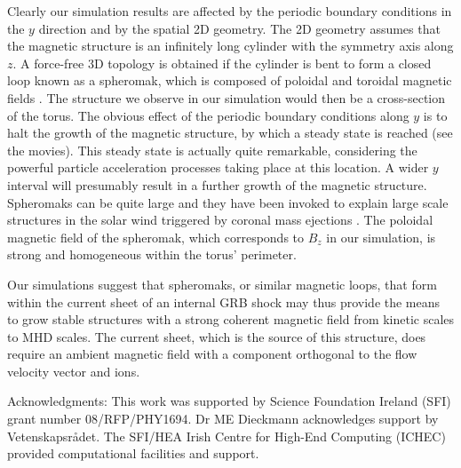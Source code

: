 \documentclass[twocolumn,showpacs,preprintnumbers,amsmath,amssymb]{revtex4}
\begin{document}
Clearly our simulation results are affected by the periodic boundary conditions in the $y$ direction 
and by the spatial 2D geometry. The 2D geometry assumes that the magnetic structure is an infinitely
long cylinder with the symmetry axis along $z$. A force-free 3D topology is obtained if the cylinder 
is bent to form a closed loop known as a spheromak, which is composed of poloidal and toroidal magnetic 
fields \cite{Old,New}. The structure we observe in our simulation would then be a cross-section of the 
torus. The obvious effect of the periodic boundary conditions along $y$ is to halt the growth of the 
magnetic structure, by which a steady state is reached (see the movies). This steady state is actually quite remarkable, 
considering the powerful particle acceleration processes taking place at this location. A wider $y$ 
interval will presumably result in a further growth of the magnetic structure. Spheromaks can be
quite large and they have been invoked to explain large scale structures in the solar wind triggered by 
coronal mass ejections \cite{Kataoka}. The poloidal magnetic field of the spheromak, which corresponds 
to $B_z$ in our simulation, is strong and homogeneous within the torus' perimeter. 

Our simulations suggest that spheromaks, or similar magnetic loops, that form within the current sheet 
of an internal GRB shock may thus provide the means to grow stable structures with a strong coherent 
magnetic field from kinetic scales to MHD scales. The current sheet, which is the source of this structure,
does require an ambient magnetic field with a component orthogonal to the flow velocity vector and ions.

Acknowledgments: This work was supported by Science Foundation Ireland (SFI) grant number 08/RFP/PHY1694.
Dr ME Dieckmann acknowledges support by Vetenskapsr\aa det. 
The SFI/HEA Irish Centre for High-End Computing (ICHEC) provided 
computational facilities and support.
\end{document}
